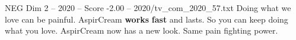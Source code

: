\begin{textsample}{NEG Dim 2 – 2020 – Score -2.00 – 2020/tv\_com\_2020\_57.txt}  \label{ex:f2_neg_031}
Doing what we love can be painful.
AspirCream \textbf{works} \textbf{fast} and lasts.
So you can keep doing what you love.
AspirCream now has a new look.
Same pain fighting power.

\end{textsample}
